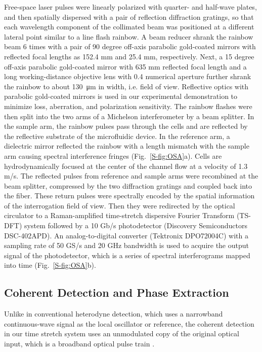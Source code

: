 \documentclass[aps,pra,reprint,superscriptaddress]{revtex4-1}
\begin{document}
Free-space laser pulses were linearly polarized with quarter- and half-wave plates, and then spatially dispersed with a pair of reflection diffraction gratings, so that each wavelength component of the collimated beam was positioned at a different lateral point similar to a line flash rainbow. A beam reducer shrank the rainbow beam 6 times with a pair of 90 degree off-axis parabolic gold-coated mirrors with reflected focal lengths as 152.4 mm and 25.4 mm, respectively. Next, a 15 degree off-axis parabolic gold-coated mirror with 635 mm reflected focal length and a long working-distance objective lens with 0.4 numerical aperture further shrank the rainbow to about \SI{130}{\micro\meter} in width, i.e. field of view. Reflective optics with parabolic gold-coated mirrors is used in our experimental demonstration to minimize loss, aberration, and polarization sensitivity. The rainbow flashes were then split into the two arms of a Michelson interferometer by a beam splitter. In the sample arm, the rainbow pulses pass through the cells and are reflected by the reflective substrate of the microfluidic device. In the reference arm, a dielectric mirror reflected the rainbow with a length mismatch with the sample arm causing spectral interference fringes (Fig.~\ref{S-fig:OSA}a). Cells are hydrodynamically focused at the center of the channel flow at a velocity of 1.3 m/s. The reflected pulses from reference and sample arms were recombined at the beam splitter, compressed by the two diffraction gratings and coupled back into the fiber. These return pulses were spectrally encoded by the spatial information of the interrogation field of view. Then they were redirected by the optical circulator to a Raman-amplified time-stretch dispersive Fourier Transform (TS-DFT) system followed by a 10 Gb/s photodetector (Discovery Semiconductors DSC-402APD). An analog-to-digital converter (Tektronix DPO72004C) with a sampling rate of 50 GS/s and 20 GHz bandwidth is used to acquire the output signal of the photodetector, which is a series of spectral interferograms mapped into time (Fig.~\ref{S-fig:OSA}b). 

\subsection*{Coherent Detection and Phase Extraction}

Unlike in conventional heterodyne detection, which uses a narrowband continuous-wave signal as the local oscillator or reference, the coherent detection in our time stretch system uses an unmodulated copy of the original optical input, which is a broadband optical pulse train \cite{buckley2013coherent, devore2014coherent}. 
\end{document}
